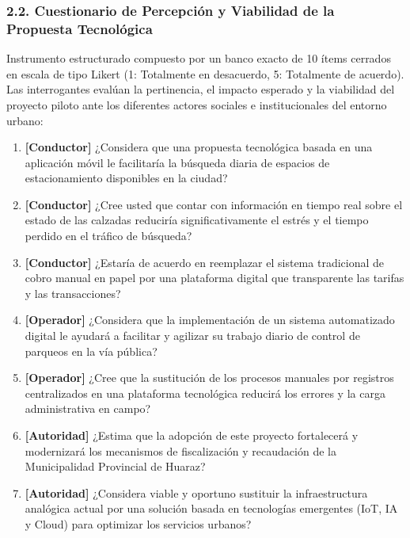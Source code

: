\documentclass[12pt,a4paper]{article}
\begin{document}
\subsubsection{2.2. Cuestionario de Percepción y Viabilidad de la Propuesta Tecnológica}
Instrumento estructurado compuesto por un banco exacto de 10 ítems cerrados en escala de tipo Likert (1: Totalmente en desacuerdo, 5: Totalmente de acuerdo). Las interrogantes evalúan la pertinencia, el impacto esperado y la viabilidad del proyecto piloto ante los diferentes actores sociales e institucionales del entorno urbano:

\begin{enumerate}
	\item \textbf{[Conductor]} ¿Considera que una propuesta tecnológica basada en una aplicación móvil le facilitaría la búsqueda diaria de espacios de estacionamiento disponibles en la ciudad?
	
	\item \textbf{[Conductor]} ¿Cree usted que contar con información en tiempo real sobre el estado de las calzadas reduciría significativamente el estrés y el tiempo perdido en el tráfico de búsqueda?
	
	\item \textbf{[Conductor]} ¿Estaría de acuerdo en reemplazar el sistema tradicional de cobro manual en papel por una plataforma digital que transparente las tarifas y las transacciones?
	
	\item \textbf{[Operador]} ¿Considera que la implementación de un sistema automatizado digital le ayudará a facilitar y agilizar su trabajo diario de control de parqueos en la vía pública?
	
	\item \textbf{[Operador]} ¿Cree que la sustitución de los procesos manuales por registros centralizados en una plataforma tecnológica reducirá los errores y la carga administrativa en campo?
	
	\item \textbf{[Autoridad]} ¿Estima que la adopción de este proyecto fortalecerá y modernizará los mecanismos de fiscalización y recaudación de la Municipalidad Provincial de Huaraz?
	
	\item \textbf{[Autoridad]} ¿Considera viable y oportuno sustituir la infraestructura analógica actual por una solución basada en tecnologías emergentes (IoT, IA y Cloud) para optimizar los servicios urbanos?
	

\end{enumerate}
\end{document}
